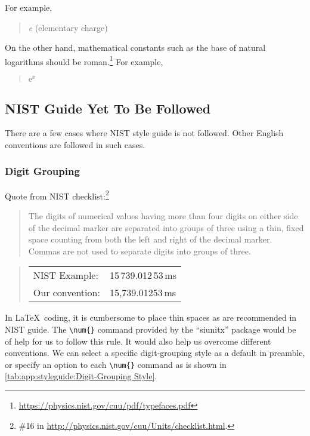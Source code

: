 For example,
\begin{quote}
  {\textit e} (elementary charge)
\end{quote}

On the other hand, mathematical constants such as the base
of natural logarithms should be roman.\footnote{
  \url{https://physics.nist.gov/cuu/pdf/typefaces.pdf}
}
For example,

\begin{quote}
  $\mathrm{e}^x$
\end{quote}


\subsection{NIST Guide Yet To Be Followed}
\label{sec:app:styleguide:NIST Guides Yet To Be Followed}

There are a few cases where NIST style guide is not followed.
Other English conventions are followed in such cases.

\subsubsection{Digit Grouping}
\label{sec:app:styleguide:Digit Grouping}

Quote from NIST checklist:\footnote{
  \#16 in \url{http://physics.nist.gov/cuu/Units/checklist.html}.
}

\begin{quote}
  The digits of numerical values having more than four digits on either
  side of the decimal marker are separated into groups of three using
  a thin, fixed space counting from both the left and right of the decimal
  marker. Commas are not used to separate digits into groups of three.
\end{quote}

\begin{quote}
\begin{tabular}{ll}
  NIST Example:& 15\,739.012\,53\,ms\\
  Our convention:& 15,739.01253\,ms\\
\end{tabular}
\end{quote}

In \LaTeX\ coding, it is cumbersome to place thin spaces as are recommended
in NIST guide. The \verb|\num{}| command provided by the ``siunitx''
package would be of help for us to follow this rule.
It would also help us overcome different conventions.
We can select a specific digit-grouping style as
a default in preamble, or specify an option to each \verb|\num{}|
command as is shown in
\cref{tab:app:styleguide:Digit-Grouping Style}.

